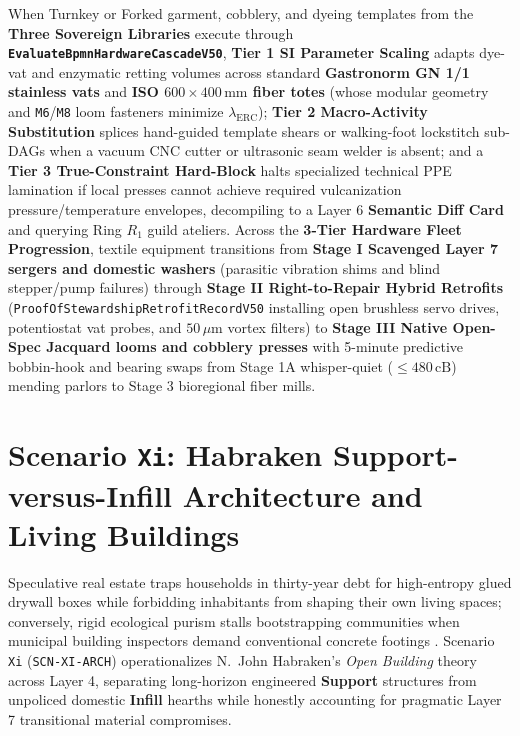 When Turnkey or Forked garment, cobblery, and dyeing templates from the \textbf{Three Sovereign Libraries} execute through
\textbf{\texttt{EvaluateBpmnHardwareCascadeV50}}, \textbf{Tier 1 SI Parameter Scaling} adapts dye-vat and enzymatic retting volumes across standard
\textbf{Gastronorm GN 1/1 stainless vats} and \textbf{ISO $600\times 400\,\mathrm{mm}$ fiber totes} (whose modular geometry and \texttt{M6}/\texttt{M8} loom
fasteners minimize $\lambda_{\mathrm{ERC}}$); \textbf{Tier 2 Macro-Activity Substitution} splices hand-guided template shears or walking-foot lockstitch
sub-DAGs when a vacuum CNC cutter or ultrasonic seam welder is absent; and a \textbf{Tier 3 True-Constraint Hard-Block} halts specialized technical
PPE lamination if local presses cannot achieve required vulcanization pressure/temperature envelopes, decompiling to a Layer 6 \textbf{Semantic Diff
Card} and querying Ring $R_1$ guild ateliers. Across the \textbf{3-Tier Hardware Fleet Progression}, textile equipment transitions from \textbf{Stage I
Scavenged Layer 7 sergers and domestic washers} (parasitic vibration shims and blind stepper/pump failures) through \textbf{Stage II Right-to-Repair
Hybrid Retrofits} (\texttt{ProofOfStewardshipRetrofitRecordV50} installing open brushless servo drives, potentiostat vat probes, and $50\,\mu\mathrm{m}$
vortex filters) to \textbf{Stage III Native Open-Spec Jacquard looms and cobblery presses} with 5-minute predictive bobbin-hook and bearing swaps from
Stage 1A whisper-quiet ($\le 480\,\mathrm{cB}$) mending parlors to Stage 3 bioregional fiber mills.

\section{Scenario \texttt{Xi}: Habraken Support-versus-Infill Architecture and Living Buildings}
\label{sec:scn-xi}

Speculative real estate traps households in thirty-year debt for high-entropy glued drywall boxes while forbidding inhabitants from shaping their
own living spaces; conversely, rigid ecological purism stalls bootstrapping communities when municipal building inspectors demand conventional
concrete footings \parencite{habraken1972supports,scott1998}. Scenario \texttt{Xi} (\texttt{SCN-XI-ARCH}) operationalizes N.~John Habraken's
\emph{Open Building} theory across Layer 4, separating long-horizon engineered \textbf{Support} structures from unpoliced domestic
\textbf{Infill} hearths while honestly accounting for pragmatic Layer 7 transitional material compromises.

